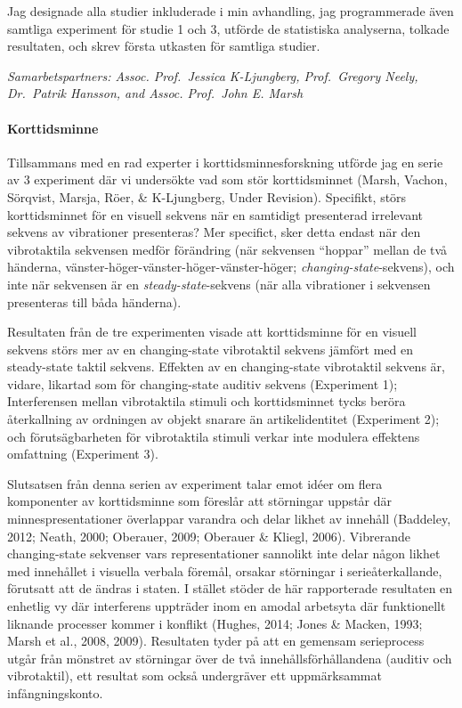 \documentclass[]{article}
\begin{document}
Jag designade alla studier inkluderade i min avhandling, jag
programmerade även samtliga experiment för studie 1 och 3, utförde de
statistiska analyserna, tolkade resultaten, och skrev första utkasten
för samtliga studier.

\emph{Samarbetspartners: Assoc. Prof.~Jessica K-Ljungberg, Prof.~Gregory
Neely, Dr.~Patrik Hansson, and Assoc. Prof.~John E. Marsh}

\paragraph{Korttidsminne}\label{korttidsminne}

Tillsammans med en rad experter i korttidsminnesforskning utförde jag en
serie av 3 experiment där vi undersökte vad som stör korttidsminnet
(Marsh, Vachon, Sörqvist, Marsja, Röer, \& K-Ljungberg, Under Revision).
Specifikt, störs korttidsminnet för en visuell sekvens när en samtidigt
presenterad irrelevant sekvens av vibrationer presenteras? Mer
specifict, sker detta endast när den vibrotaktila sekvensen medför
förändring (när sekvensen ``hoppar'' mellan de två händerna,
vänster-höger-vänster-höger-vänster-höger;
\emph{changing-state}-sekvens), och inte när sekvensen är en
\emph{steady-state}-sekvens (när alla vibrationer i sekvensen
presenteras till båda händerna).

Resultaten från de tre experimenten visade att korttidsminne för en
visuell sekvens störs mer av en changing-state vibrotaktil sekvens
jämfört med en steady-state taktil sekvens. Effekten av en
changing-state vibrotaktil sekvens är, vidare, likartad som för
changing-state auditiv sekvens (Experiment 1); Interferensen mellan
vibrotaktila stimuli och korttidsminnet tycks beröra återkallning av
ordningen av objekt snarare än artikelidentitet (Experiment 2); och
förutsägbarheten för vibrotaktila stimuli verkar inte modulera effektens
omfattning (Experiment 3).

Slutsatsen från denna serien av experiment talar emot idéer om flera
komponenter av korttidsminne som föreslår att störningar uppstår där
minnespresentationer överlappar varandra och delar likhet av innehåll
(Baddeley, 2012; Neath, 2000; Oberauer, 2009; Oberauer \& Kliegl, 2006).
Vibrerande changing-state sekvenser vars representationer sannolikt inte
delar någon likhet med innehållet i visuella verbala föremål, orsakar
störningar i serieåterkallande, förutsatt att de ändras i staten. I
stället stöder de här rapporterade resultaten en enhetlig vy där
interferens uppträder inom en amodal arbetsyta där funktionellt liknande
processer kommer i konflikt (Hughes, 2014; Jones \& Macken, 1993; Marsh
et al., 2008, 2009). Resultaten tyder på att en gemensam serieprocess
utgår från mönstret av störningar över de två innehållsförhållandena
(auditiv och vibrotaktil), ett resultat som också undergräver ett
uppmärksammat infångningskonto.
\end{document}
